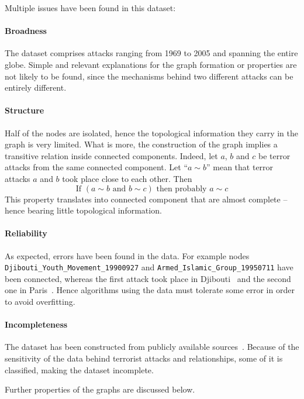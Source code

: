 Multiple issues have been found in this dataset:

\paragraph{Broadness} 
The dataset comprises attacks ranging from 1969 to 2005 and spanning the entire globe. Simple and relevant explanations for the graph formation or properties are not likely to be found, since the mechanisms behind two different attacks can be entirely different.

\paragraph{Structure} 
\label{par:Structure}
Half of the nodes are isolated, hence the topological information they carry in the graph is very limited. What is more, the construction of the graph implies a transitive relation inside connected components. Indeed, let $a$, $b$ and $c$ be terror attacks from the same connected component. Let ``$a\sim b$'' mean that terror attacks $a$ and $b$ took place close to each other. Then
\begin{equation}
\text{If } \left ( a \sim b \text{ and } b \sim c \right )  \text{ then probably } a \sim c
\label{eq:transitivity}
\end{equation}
This property translates into connected component that are almost complete -- hence bearing little topological information.

\paragraph{Reliability} 
As expected, errors have been found in the data. For example nodes
 \texttt{Djibouti\_Youth\_Movement\_19900927} 
 and 
 \texttt{Armed\_Islamic\_Group\_19950711} 
 have been connected, whereas the first attack took place in Djibouti~\cite{amnesty1991} and the second one in Paris~\cite{nouvelObs2007}. Hence algorithms using the data must tolerate some error in order to avoid overfitting.

\paragraph{Incompleteness}
The dataset has been constructed from publicly available sources~\cite{ZSG2006}. Because of the sensitivity of the data behind terrorist attacks and relationships, some of it is classified, making the dataset incomplete.

Further properties of the graphs are discussed below.


